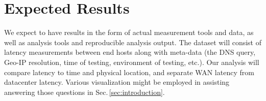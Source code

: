 \section{Expected Results}
\label{sec:results}

We expect to have results in the form of actual measurement tools and data, as well as analysis tools and reproducible analysis output. The dataset will consist of latency measurements between end hosts along with meta-data (the DNS query, Geo-IP resolution, time of testing, environment of testing, etc.). Our analysis will compare latency to time and physical location, and separate WAN latency from datacenter latency. Various visualization might be employed in assisting answering those questions in Sec.\,\ref{sec:introduction}.

